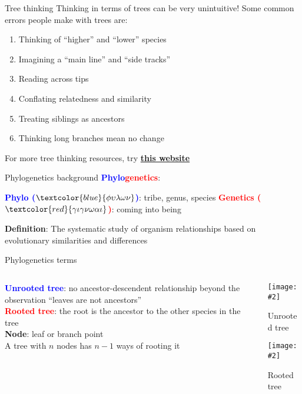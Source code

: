\documentclass{beamer}
\renewcommand{\c}[1]{\begin{center}#1\end{center}}
\newcommand{\blu}[1]{\textcolor{blue}{\textbf{#1}}}
\newcommand{\red}[1]{\textcolor{red}{\textbf{#1}}}
\newcommand{\grn}[1]{\textcolor{dark-green}{\textbf{#1}}}
\newcommand{\gr}[2][.95]{\c{\texttt{[image: \#2]}}}
\begin{document}
\begin{frame}{Tree thinking}
    Thinking in terms of trees can be very unintuitive! Some common errors people make with trees are:
    \begin{enumerate}
        \item Thinking of ``higher'' and ``lower'' species
        \item Imagining a ``main line'' and ``side tracks''
        \item Reading across tips
        \item Conflating relatedness and similarity
        \item Treating siblings as ancestors
        \item Thinking long branches mean no change
    \end{enumerate}
    For more tree thinking resources, try \blu{\href{https://evolution.berkeley.edu/evolution-101/}{this website}}
\end{frame}

\begin{frame}{Phylogenetics background}
    \blu{Phylo}\red{genetics}:
    \begin{outline}
        \1[] \blu{Phylo ($\textcolor{blue}{\phi\upsilon\lambda\omega\nu}$)}: tribe, genus, species
        \1[] \red{Genetics ($\textcolor{red}{\gamma\iota\gamma\nu\omega\alpha\iota}$)}: coming into being
    \end{outline}
    \bigskip
    \textbf{Definition}: The systematic study of organism relationships based on evolutionary similarities and differences
\end{frame}

\begin{frame}{Phylogenetics terms}
\begin{columns}
    \begin{column}{0.7\textwidth}
        \blu{Unrooted tree}: no ancestor-descendent relationship beyond the observation ``leaves are not ancestors''\\
        \bigskip
        \red{Rooted tree}: the root is the ancestor to the other species in the tree\\
        \bigskip
        \grn{Node}: leaf or branch point\\
        \bigskip
        A tree with $n$ nodes has $n-1$ ways of rooting it
    \end{column}
    \begin{column}{0.3\textwidth}
        \gr{l5_figs/s10_unrooted_tree.png}
        Unrooted tree\\
        \bigskip
        \gr{l5_figs/s10_rooted_tree.png}
        Rooted tree
    \end{column}
\end{columns}
\end{frame}
\end{document}
